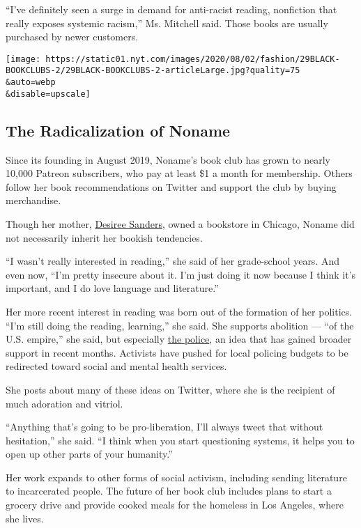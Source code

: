 ``I've definitely seen a surge in demand for anti-racist reading,
nonfiction that really exposes systemic racism,'' Ms. Mitchell said.
Those books are usually purchased by newer customers.

\texttt{[image: https://static01.nyt.com/images/2020/08/02/fashion/29BLACK-BOOKCLUBS-2/29BLACK-BOOKCLUBS-2-articleLarge.jpg?quality=75\\\&auto=webp\\\&disable=upscale]}

\hypertarget{the-radicalization-of-noname}{%
\subsection{The Radicalization of
Noname}\label{the-radicalization-of-noname}}

Since its founding in August 2019, Noname's book club has grown to
nearly 10,000 Patreon subscribers, who pay at least \$1 a month for
membership. Others follow her book recommendations on Twitter and
support the club by buying merchandise.

Though her mother,
\href{https://twitter.com/nonamebooks/status/1153723696990715906?lang=en}{Desiree
Sanders}, owned a bookstore in Chicago, Noname did not necessarily
inherit her bookish tendencies.

``I wasn't really interested in reading,'' she said of her grade-school
years. And even now, ``I'm pretty insecure about it. I'm just doing it
now because I think it's important, and I do love language and
literature.''

Her more recent interest in reading was born out of the formation of her
politics. ``I'm still doing the reading, learning,'' she said. She
supports abolition --- ``of the U.S. empire,'' she said, but especially
\href{https://slack-redir.net/link?url=https\%3A\%2F\%2Fwww.nytimes.com\%2F2020\%2F06\%2F12\%2Fopinion\%2Fsunday\%2Ffloyd-abolish-defund-police.html}{the
police}, an idea that has gained broader support in recent months.
Activists have pushed for local policing budgets to be redirected toward
social and mental health services.

She posts about many of these ideas on Twitter, where she is the
recipient of much adoration and vitriol.

``Anything that's going to be pro-liberation, I'll always tweet that
without hesitation,'' she said. ``I think when you start questioning
systems, it helps you to open up other parts of your humanity.''

Her work expands to other forms of social activism, including sending
literature to incarcerated people. The future of her book club includes
plans to start a grocery drive and provide cooked meals for the homeless
in Los Angeles, where she lives.

